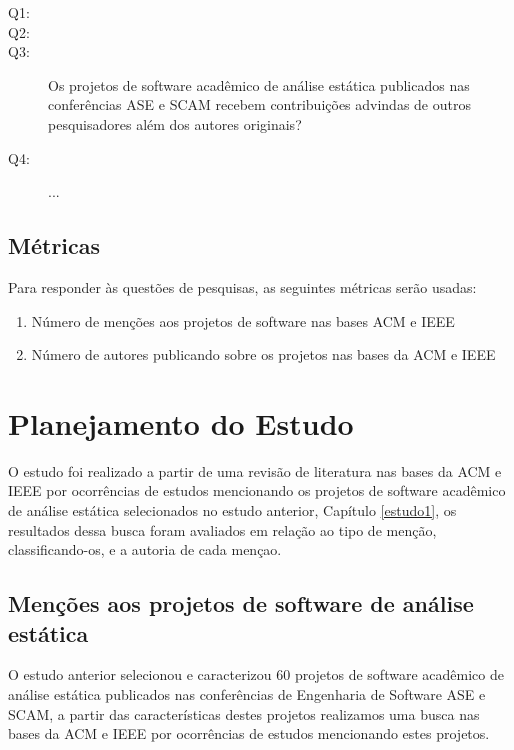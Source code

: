 \newcommand{\EstudoDoisQuestaoTres}{Os projetos de software acadêmico de
análise estática publicados nas conferências ASE e SCAM recebem contribuições
advindas de outros pesquisadores além dos autores originais?}

\newcommand{\EstudoDoisQuestaoQuatro}{
...
}

\begin{description}
  \item [Q1:] \EstudoDoisQuestaoUm
  \item [Q2:] \EstudoDoisQuestaoDois
  \item [Q3:] \EstudoDoisQuestaoTres
  \item [Q4:] \EstudoDoisQuestaoQuatro
\end{description}

\subsection{Métricas}

Para responder às questões de pesquisas, as seguintes métricas serão usadas:

\begin{enumerate}
  \item Número de menções aos projetos de software nas bases ACM e IEEE
  \item Número de autores publicando sobre os projetos nas bases da ACM e IEEE
\end{enumerate}


\section{Planejamento do Estudo}

O estudo foi realizado a partir de uma revisão de literatura nas bases da ACM e
IEEE por ocorrências de estudos mencionando os projetos de software acadêmico
de análise estática selecionados no estudo anterior, Capítulo \ref{estudo1}, os
resultados dessa busca foram avaliados em relação ao tipo de menção,
classificando-os, e a autoria de cada mençao.

\subsection{Menções aos projetos de software de análise estática}

O estudo anterior selecionou e caracterizou 60 projetos de software acadêmico
de análise estática publicados nas conferências de Engenharia de Software ASE e
SCAM, a partir das características destes projetos realizamos uma busca
nas bases da ACM e IEEE por ocorrências de estudos mencionando estes projetos.

